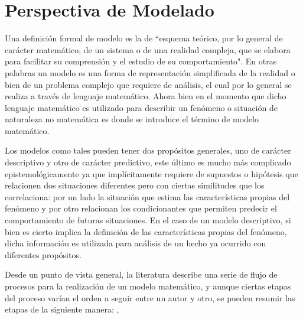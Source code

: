 \section{Perspectiva de Modelado}

Una definición formal de modelo es la de ``esquema teórico, por lo general de carácter matemático, de un sistema o de una realidad compleja, que se elabora para facilitar su comprensión y el estudio de su comportamiento"\cite{rae}. En otras palabras un modelo es una forma de representación simplificada de la realidad o bien de un problema complejo que requiere de análisis, el cual por lo general se realiza a través de lenguaje matemático. Ahora bien en el momento que dicho lenguaje matemático es utilizado para describir un fenómeno o situación de naturaleza no matemática es donde se introduce el término de modelo matemático. \cite{morten}

Los modelos como tales pueden tener dos propósitos generales, uno de carácter descriptivo y otro de carácter predictivo, este último es mucho más complicado epistemológicamente ya que implícitamente requiere de supuestos o hipótesis que relacionen dos situaciones  diferentes pero con ciertas similitudes que los correlaciona: por un lado la situación que estima las características propias del fenómeno y por otro relacionan los condicionantes que permiten predecir el comportamiento de futuras situaciones. En el caso de un modelo descriptivo, si bien es cierto implica la definición de las características propias del fenómeno, dicha información es utilizada para análisis de un hecho ya ocurrido con diferentes propósitos. \cite{morten} 

Desde un punto de vista general, la literatura describe una serie de flujo de procesos para la realización de un modelo matemático, y aunque ciertas etapas del proceso varían el orden a seguir entre un autor y otro, se pueden resumir las etapas de la siguiente manera: \cite{morten}, \cite{comillas}

